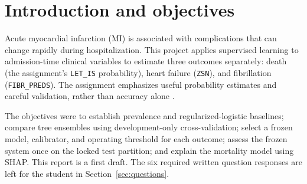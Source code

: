 \section{Introduction and objectives}
Acute myocardial infarction (MI) is associated with complications that can change rapidly during hospitalization. This project applies supervised learning to admission-time clinical variables to estimate three outcomes separately: death (the assignment's \texttt{LET\_IS} probability), heart failure (\texttt{ZSN}), and fibrillation (\texttt{FIBR\_PREDS}). The assignment emphasizes useful probability estimates and careful validation, rather than accuracy alone \cite{assignmentguide,ucimi}.

The objectives were to establish prevalence and regularized-logistic baselines; compare tree ensembles using development-only cross-validation; select a frozen model, calibrator, and operating threshold for each outcome; assess the frozen system once on the locked test partition; and explain the mortality model using SHAP. This report is a first draft. The six required written question responses are left for the student in Section~\ref{sec:questions}.
